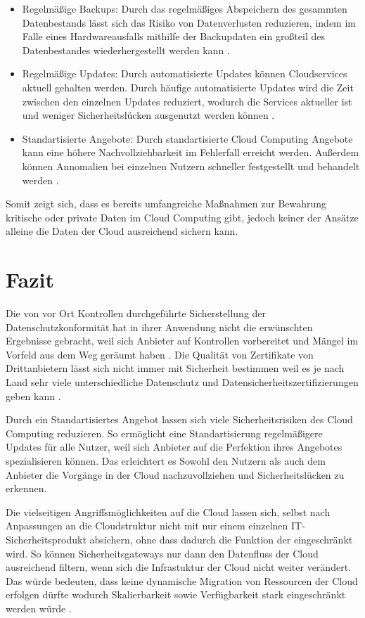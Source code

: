 \begin{itemize}
\item 
Regelmäßige Backups: Durch das regelmäßiges Abspeichern des gesammten Datenbestands lässt sich das Risiko von Datenverlusten reduzieren, indem im Falle eines Hardwareausfalls mithilfe der Backupdaten ein großteil des Datenbestandes wiederhergestellt werden kann \cite{wehrhahn-aklender2019}.
\item
Regelmäßige Updates: Durch automatisierte Updates können Cloudservices aktuell gehalten werden. Durch häufige automatisierte Updates wird die Zeit zwischen den einzelnen Updates reduziert, wodurch die Services aktueller ist und weniger Sicherheitslücken ausgenutzt werden können \cite{wehrhahn-aklender2019}.
\item
Standartisierte Angebote: Durch standartisierte Cloud Computing Angebote kann eine höhere Nachvollziehbarkeit im Fehlerfall erreicht werden. Außerdem können Annomalien bei einzelnen Nutzern schneller festgestellt und behandelt werden \cite{wehrhahn-aklender2019}.
\end{itemize}

Somit zeigt sich, dass es bereits umfangreiche Maßnahmen zur Bewahrung kritische oder private Daten im Cloud Computing gibt, jedoch keiner der Ansätze alleine die Daten der Cloud ausreichend sichern kann.


\section{Fazit}
Die von vor Ort Kontrollen durchgeführte Sicherstellung der Datenschutzkonformität hat in ihrer Anwendung nicht die erwünschten Ergebnisse gebracht, weil sich Anbieter auf Kontrollen vorbereitet und Mängel im Vorfeld aus dem Weg geräumt haben \cite{selzer2020}.
Die Qualität von Zertifikate von Drittanbietern lässt sich nicht immer mit Sicherheit bestimmen weil es je nach Land sehr viele unterschiedliche Datenschutz und Datensicherheitszertifizierungen geben kann \cite{selzer2020}.

Durch ein Standartisiertes Angebot lassen sich viele Sicherheitsrisiken des Cloud Computing reduzieren. So ermöglicht eine Standartisierung regelmäßigere Updates für alle Nutzer, weil sich Anbieter auf die Perfektion ihres Angebotes spezialisieren können. Das erleichtert es Sowohl den Nutzern als auch dem Anbieter die Vorgänge in der Cloud nachzuvollziehen und Sicherheitslücken zu erkennen. 

Die vielseitigen Angriffsmöglichkeiten auf die Cloud lassen sich, selbst nach Anpassungen an die Cloudstruktur nicht mit nur einem einzelnen IT-Sicherheitsprodukt absichern, ohne dass dadurch die Funktion der eingeschränkt wird. So können Sicherheitsgateways nur dann den Datenfluss der Cloud ausreichend filtern, wenn sich die Infrastuktur der Cloud nicht weiter verändert. Das würde bedeuten, dass keine dynamische Migration von Ressourcen der Cloud erfolgen dürfte wodurch Skalierbarkeit sowie Verfügbarkeit stark eingeschränkt werden würde \cite{wehrhahn-aklender2019}.
